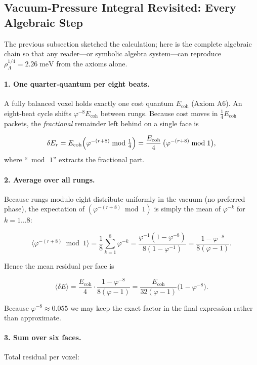 \documentclass[11pt]{article}
\begin{document}
\subsection{Vacuum‐Pressure Integral Revisited: Every Algebraic Step}
\label{subsec:vacuum-pressure-detailed}

The previous subsection sketched the calculation; here is the complete algebraic chain so that
any reader—or symbolic algebra system—can reproduce
\(\rho_\Lambda^{1/4}=2.26\;\text{meV}\) from the axioms alone.

\paragraph{1.  One quarter‐quantum per eight beats.}
A fully balanced voxel holds exactly one cost quantum
\(E_{\text{coh}}\) (Axiom A6).
An eight‐beat cycle shifts
\(\varphi^{-8}E_{\text{coh}}\) between rungs.
Because cost moves in \(\tfrac14 E_{\text{coh}}\) packets, the
\emph{fractional} remainder left behind on a single face is

\[
\delta E_r
= 
E_{\text{coh}}
\Bigl(
\varphi^{-(r+8)} 
\bmod 
\tfrac14
\Bigr)
=
\frac{E_{\text{coh}}}{4}\,
\bigl(\varphi^{-(r+8)}\bmod 1\bigr),
\]
where “\(\bmod\,1\)” extracts the fractional part.

\paragraph{2.  Average over all rungs.}
Because rungs modulo eight distribute uniformly in the vacuum (no
preferred phase), the expectation of 
\((\varphi^{-(r+8)}\bmod 1)\)
is simply the mean of \(\varphi^{-k}\) for \(k=1\ldots8\):

\[
\langle \varphi^{-(r+8)}\bmod 1\rangle
=
\frac{1}{8}\sum_{k=1}^{8}\varphi^{-k}
=
\frac{\varphi^{-1}(1-\varphi^{-8})}{8(1-\varphi^{-1})}
=
\frac{1-\varphi^{-8}}{8(\varphi-1)}.
\]

Hence the mean residual per face is

\[
\langle\delta E\rangle
=
\frac{E_{\text{coh}}}{4}
\cdot
\frac{1-\varphi^{-8}}{8(\varphi-1)}
=
\frac{E_{\text{coh}}}{32(\varphi-1)}
\bigl(1-\varphi^{-8}\bigr).
\]

Because \(\varphi^{-8}\approx0.055\) we may keep the exact factor in the
final expression rather than approximate.

\paragraph{3.  Sum over six faces.}
Total residual per voxel:
\end{document}
